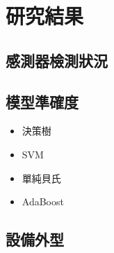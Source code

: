 \chapter{研究結果}

\section{感測器檢測狀況}

\section{模型準確度}
\begin{itemize}
	\item 決策樹
	
	\item SVM
	
	\item 單純貝氏
	
	\item AdaBoost
	
\end{itemize}

\section{設備外型}
